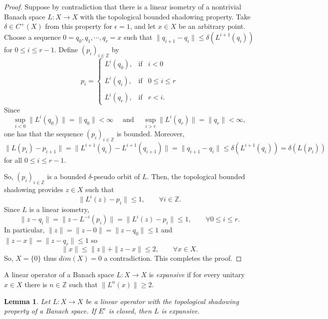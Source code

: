 \documentclass[11pt,letterpaper]{amsart}
\newtheorem{lem}{Lemma}
\numberwithin{equation}{section}
\begin{document}
\begin{proof}

Suppose by contradiction that there is a linear isometry of a nontrivial Banach space $L:X\to X$ with the topological bounded shadowing property.
Take $\delta\in C^+(X)$ from this property for $\epsilon=1$,
and let $x\in X$ be an arbitrary point.
Choose a sequence
$0=q_0, q_1,\cdots, q_r=x$ such that
$\|q_{i+1}-q_i\|\leq\delta(L^{i+1}(q_i))$ for $0\leq i\leq r-1$.
Define $(p_i)_{i\in\mathbb{Z}}$ by
$$
p_i = \left\{ \begin{array}{rcl}
L^i(q_0),& \mbox{if} & i<0\\
& & \\
L^i(q_i), & \mbox{if} & 0\leq i\leq r\\
& & \\
L^i(q_r), & \mbox{if} & r<i.
\end{array} \right.
$$
Since
$$
\sup_{i<0}\|L^i(q_0)\|=\|q_0\|<\infty\quad\mbox{ and }\quad
\sup_{i>r}\|L^i(q_r)\|=\|q_r\|<\infty,
$$
one has that the sequence $(p_i)_{i\in\mathbb{Z}}$ is bounded.
Moreover,
$$
\|L(p_i)-p_{i+1}\|=\|L^{i+1}(q_i)-L^{i+1}(q_{i+1})\|=\|q_{i+1}-q_i\|\leq\delta(L^{i+1}(q_i))=\delta(L(p_i))
$$
for all $0\leq i\leq r-1$.

So, $(p_i)_{i\in\mathbb{Z}}$ is a bounded
$\delta$-pseudo orbit of $L$.
Then, the topological bounded shadowing provides
$z\in X$ such that
$$
\|L^i(z)-p_i\|\leq 1,\quad\quad\forall i\in\mathbb{Z}.
$$
Since $L$ is a linear isometry,
$$
\|z-q_i\|=\|z-L^{-i}(p_i)\|=\|L^i(z)-p_i\|\leq1,\quad\quad\forall 0\leq i\leq r.
$$
In particular,
$\|z\|=\|z-0\|=\|z-q_0\|\leq1$ and $\|z-x\|=\|z-q_r\|\leq1$ so
$$
\|x\|\leq \|z\|+\|z-x\|\leq 2,\quad\quad\forall x\in X.
$$
So, $X=\{0\}$ thus $dim(X)=0$ a contradiction. This completes the proof.
\end{proof}

A linear operator of a Banach space $L:X\to X$ is
{\em expansive} if for every unitary $x\in X$ there is $n\in\mathbb{Z}$ such that $\|L^n(x)\|\geq2$.

\begin{lem}
\label{baja}
Let $L:X\to X$ be a linear operator with the topological shadowing property of a Banach space. If $E^c$ is closed, then $L$ is expansive.
\end{lem}
\end{document}
